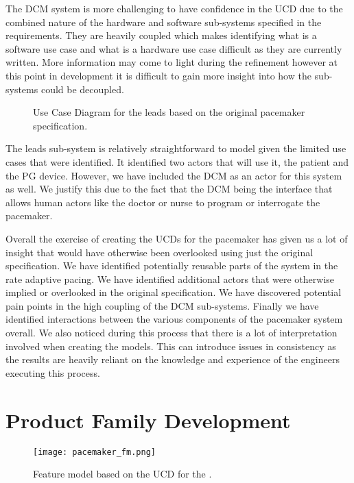 The DCM system is more challenging to have confidence in the UCD due to the combined nature of the hardware and software sub-systems specified in the requirements. They are heavily coupled which makes identifying what is a software use case and what is a hardware use case difficult as they are currently written. More information may come to light during the refinement however at this point in development it is difficult to gain more insight into how the sub-systems could be decoupled.

\begin{figure}
	\centering
	
	\caption{Use Case Diagram for the leads based on the original pacemaker specification.}
	\label{fig:Leads_UCD_original_spec}
\end{figure}

The leads sub-system is relatively straightforward to model given the limited use cases that were identified. It identified two actors that will use it, the patient and the PG device. However, we have included the DCM as an actor for this system as well. We justify this due to the fact that the DCM being the interface that allows human actors like the doctor or nurse to program or interrogate the pacemaker. 

Overall the exercise of creating the UCDs for the pacemaker has given us a lot of insight that would have otherwise been overlooked using just the original specification. We have identified potentially reusable parts of the system in the rate adaptive pacing. We have identified additional actors that were otherwise implied or overlooked in the original specification. We have discovered potential pain points in the high coupling of the DCM sub-systems. Finally we have identified interactions between the various components of the pacemaker system overall. We also noticed during this process that there is a lot of interpretation involved when creating the models. This can introduce issues in consistency as the results are heavily reliant on the knowledge and experience of the engineers executing this process. 

\section{Product Family Development}

\begin{figure}
	\centering
	\texttt{[image: pacemaker\_fm.png]}
	\caption{Feature model based on the UCD for the \pgd.}
	\label{fig:pacemaker_fm}
\end{figure}

